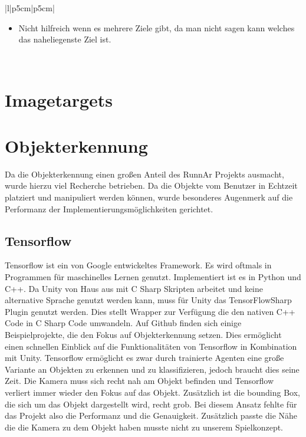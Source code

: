 \begin{table}[H]
{\begin{tabular}{|l|p{5cm}|p{5cm}|}
          \begin{minipage}{\linewidth}
            \vspace{0.1cm}
            \begin{itemize}
                \item Nicht hilfreich wenn es mehrere Ziele gibt, da man nicht sagen kann welches das naheliegenste Ziel ist.
            \end{itemize}
            \vspace{0.1cm}
        \end{minipage}                    \\ \hline
        \end{tabular}%
    }
    \caption{Vergleich A* und Dijkstra }
    \label{tbl:comparisonA*Dijkstra}
\end{table}

\section{Imagetargets}
\section{Objekterkennung}
Da die Objekterkennung einen großen Anteil des RunnAr Projekts ausmacht, wurde hierzu viel Recherche betrieben. Da die Objekte vom Benutzer in Echtzeit platziert und manipuliert werden können, wurde besonderes Augenmerk auf die Performanz der Implementierungsmöglichkeiten gerichtet.
\subsection{Tensorflow}
Tensorflow ist ein von Google entwickeltes Framework. Es wird oftmals in Programmen für maschinelles Lernen genutzt.  Implementiert ist es in Python und C++. Da Unity von Haus aus mit C Sharp Skripten arbeitet und keine alternative Sprache genutzt werden kann, muss für Unity das TensorFlowSharp Plugin genutzt werden. Dies stellt Wrapper zur Verfügung die den nativen C++ Code in C Sharp Code umwandeln. Auf Github finden sich einige Beispielprojekte, die den Fokus auf Objekterkennung setzen. Dies ermöglicht einen schnellen Einblick auf die Funktionalitäten von Tensorflow in Kombination mit Unity. Tensorflow ermöglicht es zwar durch trainierte Agenten eine große Variante an Objekten zu erkennen und zu klassifizieren, jedoch braucht dies seine Zeit. Die Kamera muss sich recht nah am Objekt befinden und Tensorflow verliert immer wieder den Fokus auf das Objekt. Zusätzlich ist die bounding Box, die sich um das Objekt dargestellt wird, recht grob. Bei diesem Ansatz fehlte für das Projekt also die Performanz und die Genauigkeit. Zusätzlich passte die Nähe die die Kamera zu dem Objekt haben musste nicht zu unserem Spielkonzept.

